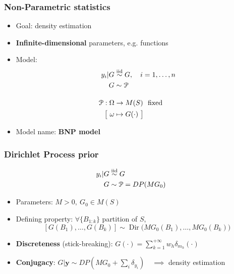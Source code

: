 

\begin{frame}
	\frametitle{Non-Parametric statistics}
	\begin{itemize}
		\item Goal: density estimation
		\item \textbf{Infinite-dimensional} parameters, e.g. functions
		\item Model:
		\begin{align*}
			y_i | G &\stackrel{\text{iid}}{\sim} G, \quad i=1,\dots,n \\
			G &\sim \mathcal P \\[10pt]
			\mathcal P : \Omega &\to M(S) \ \ \text{fixed} \\
			\big[ \ \omega &\mapsto G(\cdot) \ \big]
		\end{align*}
		\item Model name: \textbf{BNP model}
	\end{itemize}
\end{frame}

\begin{frame}
	\frametitle{Dirichlet Process prior}
	\begin{align*}
		y_i | G &\stackrel{\text{iid}}{\sim} G \\
		G &\sim \mathcal P = DP(M G_0)
	\end{align*}
	\vspace{-10pt}
	\begin{itemize}
		\item Parameters: $M > 0, \ G_0 \in M(S)$
		\vspace{5pt}
		\item Defining property: $\forall \{B_{1:k}\}$ partition of $S$,
		$$[G(B_1),\dots,G(B_k)] \sim \operatorname{Dir}
			\big( M G_0(B_1),\dots, M G_0(B_k) \big)$$
		\vspace{-15pt}
		\item \textbf{Discreteness} (stick-breaking): $G(\cdot) = \sum_{k=1}^{+\infty} w_h \delta_{m_h} (\cdot)$
		\vspace{10pt}
		\item \textbf{Conjugacy}: $G | \mathbf{y} \sim DP(M G_0 + \sum_i \delta_{y_i}) \quad \implies$ density estimation
	\end{itemize}
\end{frame}


